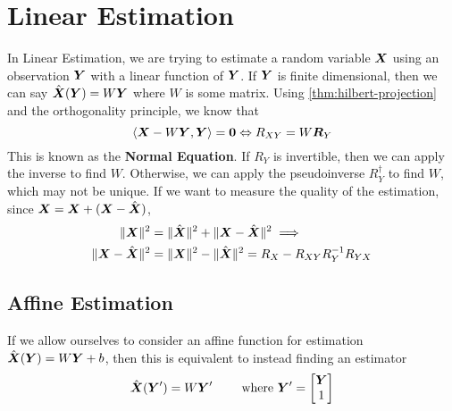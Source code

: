 \section{Linear Estimation}
In Linear Estimation, we are trying to estimate a random variable $\boldsymbol{X}$ using an observation $\boldsymbol{Y}$ with a linear function of $\boldsymbol{Y}$.
If $\boldsymbol{Y}$ is finite dimensional, then we can say $\hat{\boldsymbol{X}}(\boldsymbol{Y}) = W\boldsymbol{Y}$ where $W$ is some matrix.
Using \cref{thm:hilbert-projection} and the orthogonality principle, we know that
\[
	\langle \boldsymbol{X}-W\boldsymbol{Y}, \boldsymbol{Y} \rangle = \boldsymbol{0} \Leftrightarrow R_{XY} = W\boldsymbol{R}_Y
\]
This is known as the \textbf{Normal Equation}.
If $R_Y$ is invertible, then we can apply the inverse to find $W$.
Otherwise, we can apply the pseudoinverse $R_Y^\dagger$ to find $W$, which may not be unique.
If we want to measure the quality of the estimation, since $\boldsymbol{X} = \boldsymbol{X}+(\boldsymbol{X}-\hat{\boldsymbol{X}})$,
\begin{align*}
	\|\boldsymbol{X}\|^2 &= \|\hat{\boldsymbol{X}}\|^2 + \|\boldsymbol{X} - \hat{\boldsymbol{X}}\|^2 \implies \\
	\|\boldsymbol{X}-\hat{\boldsymbol{X}}\|^2 &= \|\boldsymbol{X}\|^2 - \|\hat{\boldsymbol{X}}\|^2 = R_X - R_{XY}R_Y^{-1}R_{YX}
\end{align*}
\subsection{Affine Estimation}
If we allow ourselves to consider an affine function for estimation $\hat{\boldsymbol{X}}(\boldsymbol{Y}) = W\boldsymbol{Y}+b$, then this is equivalent to instead finding an estimator
\[
	\hat{\boldsymbol{X}}(\boldsymbol{Y}') = W\boldsymbol{Y}' \qquad \text{ where } \boldsymbol{Y}' = \begin{bmatrix} \boldsymbol{Y} \\ 1 \end{bmatrix}
\]

